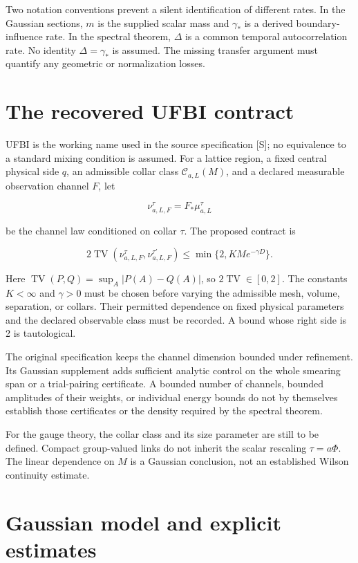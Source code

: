 \documentclass[
  11pt,
  letterpaper,
]{article}
\begin{document}
Two notation conventions prevent a silent identification of different
rates. In the Gaussian sections, \(m\) is the supplied scalar mass and
\(\gamma_*\) is a derived boundary-influence rate. In the spectral
theorem, \(\Delta\) is a common temporal autocorrelation rate. No
identity \(\Delta=\gamma_*\) is assumed. The missing transfer argument
must quantify any geometric or normalization losses.

\section{The recovered UFBI contract}\label{the-recovered-ufbi-contract}

UFBI is the working name used in the source specification {[}S{]}; no
equivalence to a standard mixing condition is assumed. For a lattice
region, a fixed central physical side \(q\), an admissible collar class
\(\mathcal C_{a,L}(M)\), and a declared measurable observation channel
\(F\), let

\[
\nu^\tau_{a,L,F}=F_*\mu^\tau_{a,L}
\]

be the channel law conditioned on collar \(\tau\). The proposed contract
is

\[
2\operatorname{TV}(\nu^\tau_{a,L,F},\nu^{\tau'}_{a,L,F})
\le \min\{2,KM e^{-\gamma D}\}.
\]

Here \(\operatorname{TV}(P,Q)=\sup_A|P(A)-Q(A)|\), so
\(2\operatorname{TV}\in[0,2]\). The constants \(K<\infty\) and
\(\gamma>0\) must be chosen before varying the admissible mesh, volume,
separation, or collars. Their permitted dependence on fixed physical
parameters and the declared observable class must be recorded. A bound
whose right side is 2 is tautological.

The original specification keeps the channel dimension bounded under
refinement. Its Gaussian supplement adds sufficient analytic control on
the whole smearing span or a trial-pairing certificate. A bounded number
of channels, bounded amplitudes of their weights, or individual energy
bounds do not by themselves establish those certificates or the density
required by the spectral theorem.

For the gauge theory, the collar class and its size parameter are still
to be defined. Compact group-valued links do not inherit the scalar
rescaling \(\tau=a\Phi\). The linear dependence on \(M\) is a Gaussian
conclusion, not an established Wilson continuity estimate.

\section{Gaussian model and explicit
estimates}\label{gaussian-model-and-explicit-estimates}
\end{document}
